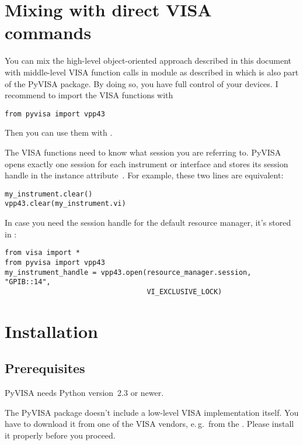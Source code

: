 \documentclass{howto}
\begin{document}
\section{Mixing with direct VISA commands}

You can mix the high-level object-oriented approach described in this document
with middle-level VISA function calls in module  as described in
 which is also part of the PyVISA package.  By doing so, you
have full control of your devices.  I recommend to import the VISA functions
with
\begin{verbatim}
from pyvisa import vpp43
\end{verbatim}
Then you can use them with .

The VISA functions need to know what session you are referring to.  PyVISA
opens exactly one session for each instrument or interface and stores its
session handle in the instance attribute~.  For example, these two
lines are equivalent:
\begin{verbatim}
my_instrument.clear()
vpp43.clear(my_instrument.vi)
\end{verbatim}

In case you need the session handle for the default resource manager, it's
stored in :
\begin{verbatim}
from visa import *
from pyvisa import vpp43
my_instrument_handle = vpp43.open(resource_manager.session, "GPIB::14",
                                  VI_EXCLUSIVE_LOCK)
\end{verbatim}


\section{Installation}

\subsection{Prerequisites}

PyVISA needs Python version~2.3 or newer.

The PyVISA package doesn't include a low-level VISA implementation itself.  You
have to download it from one of the VISA vendors, e.\,g.\ from the
.  Please install
it properly before you proceed.
\end{document}
